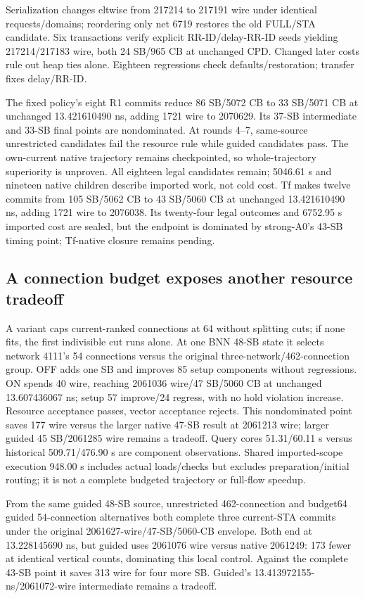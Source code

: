 \documentclass[conference,10pt]{IEEEtran}
\begin{document}
Serialization changes eltwise from 217214 to 217191 wire under identical requests/domains; reordering only net 6719 restores the old FULL/STA candidate. Six transactions verify explicit RR-ID/delay-RR-ID seeds yielding 217214/217183 wire, both 24 SB/965 CB at unchanged CPD. Changed later costs rule out heap ties alone. Eighteen regressions check defaults/restoration; transfer fixes delay/RR-ID.

The fixed policy's eight R1 commits reduce 86 SB/5072 CB to 33 SB/5071 CB at unchanged 13.421610490 ns, adding 1721 wire to 2070629. Its 37-SB intermediate and 33-SB final points are nondominated. At rounds 4--7, same-source unrestricted candidates fail the resource rule while guided candidates pass. The own-current native trajectory remains checkpointed, so whole-trajectory superiority is unproven. All eighteen legal candidates remain; 5046.61 s and nineteen native children describe imported work, not cold cost. Tf makes twelve commits from 105 SB/5062 CB to 43 SB/5060 CB at unchanged 13.421610490 ns, adding 1721 wire to 2076038. Its twenty-four legal outcomes and 6752.95 s imported cost are sealed, but the endpoint is dominated by strong-A0's 43-SB timing point; Tf-native closure remains pending.

\subsection{A connection budget exposes another resource tradeoff}
A variant caps current-ranked connections at 64 without splitting cuts; if none fits, the first indivisible cut runs alone. At one BNN 48-SB state it selects network 4111's 54 connections versus the original three-network/462-connection group. OFF adds one SB and improves 85 setup components without regressions. ON spends 40 wire, reaching 2061036 wire/47 SB/5060 CB at unchanged 13.607436067 ns; setup 57 improve/24 regress, with no hold violation increase. Resource acceptance passes, vector acceptance rejects. This nondominated point saves 177 wire versus the larger native 47-SB result at 2061213 wire; larger guided 45 SB/2061285 wire remains a tradeoff. Query cores 51.31/60.11 s versus historical 509.71/476.90 s are component observations. Shared imported-scope execution 948.00 s includes actual loads/checks but excludes preparation/initial routing; it is not a complete budgeted trajectory or full-flow speedup.

From the same guided 48-SB source, unrestricted 462-connection and budget64 guided 54-connection alternatives both complete three current-STA commits under the original 2061627-wire/47-SB/5060-CB envelope. Both end at 13.228145690 ns, but guided uses 2061076 wire versus native 2061249: 173 fewer at identical vertical counts, dominating this local control. Against the complete 43-SB point it saves 313 wire for four more SB. Guided's 13.413972155-ns/2061072-wire intermediate remains a tradeoff.
\end{document}
